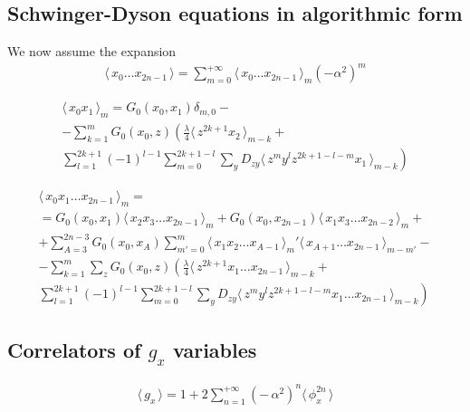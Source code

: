 \documentclass[12pt]{article}
\newcommand{\lr}[1]{ \left( #1 \right) }
\newcommand{\vev}[1]{ \langle \, #1 \, \rangle }
\begin{document}
\subsection{Schwinger-Dyson equations in algorithmic form}
\label{subsec:sd_coord_alg}

We now assume the expansion 
\begin{eqnarray}
\label{expansion_assumed}
 \vev{x_0 \ldots x_{2 n - 1}} = \sum\limits_{m=0}^{+\infty}
 \vev{x_0 \ldots x_{2 n - 1}}_m \lr{-\alpha^2}^m 
\end{eqnarray}

\begin{eqnarray}
\label{sd_g2_coord_algorithmic}
 \vev{x_0 x_1}_m = G_0\lr{x_0, x_1} \delta_{m, 0}
 - \nonumber \\ -
 \sum\limits_{k=1}^{m}
 G_0\lr{x_0, z}
 \left(
 \frac{\lambda}{4} \vev{z^{2 k + 1} x_2}_{m - k}
 + \right. \nonumber \\ \left. 
 \sum\limits_{l=1}^{2 k + 1} \lr{-1}^{l-1}
 \sum\limits_{m=0}^{2 k + 1 - l}
 \sum\limits_y D_{z y}
 \vev{z^m y^l z^{2k+1-l-m} x_1}_{m - k}
 \right)
\end{eqnarray}

\begin{eqnarray}
\label{sd_gn_coord_algorithmic}
 \vev{x_0 x_1 \ldots x_{2 n - 1}}_m 
 = \nonumber \\ =
 G_0\lr{x_0, x_1} \vev{x_2 x_3 \ldots x_{2 n - 1}}_m
 +
 G_0\lr{x_0, x_{2 n - 1}} \vev{x_1 x_3 \ldots x_{2 n - 2}}_m
 + \nonumber \\ +
 \sum\limits_{A=3}^{2 n - 3}
 G_0\lr{x_0, x_A}
 \sum\limits_{m'=0}^m
 \vev{x_1 x_2 \ldots x_{A-1}}_m'
 \vev{x_{A+1} \ldots x_{2 n - 1}}_{m - m'}
 - \nonumber \\ -
 \sum\limits_{k=1}^{m} \sum\limits_z
 G_0\lr{x_0, z}
 \left(
 \frac{\lambda}{4} \vev{z^{2 k + 1} x_1 \ldots x_{2 n - 1}}_{m - k}
 + \right. \nonumber \\ \left.
 \sum\limits_{l=1}^{2 k + 1} \lr{-1}^{l-1}
 \sum\limits_{m=0}^{2 k + 1 - l}
 \sum\limits_y D_{z y}
 \vev{z^m y^l z^{2k+1-l-m} x_1 \ldots x_{2 n - 1}}_{m - k}
 \right)
\end{eqnarray}


\subsection{Correlators of $g_x$ variables}
\label{subsec:gx_correlators_coordinate}

\begin{eqnarray}
\label{gx_vev_coordinate}
 \vev{g_x} = 1 + 2 \sum\limits_{n=1}^{+\infty} \lr{- \, \alpha^2}^n \vev{\phi_x^{2 n}}
\end{eqnarray}
\end{document}
